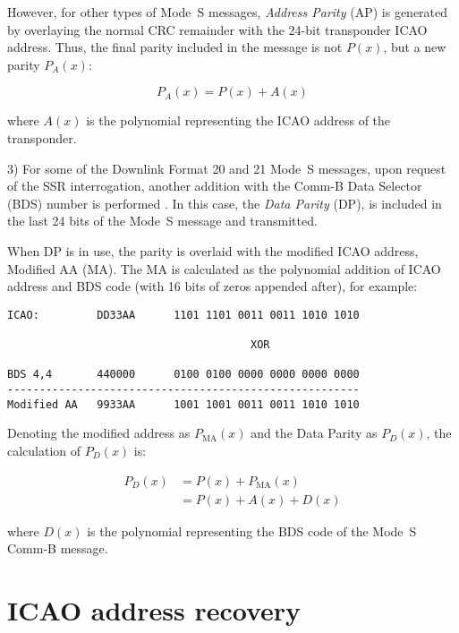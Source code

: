 However, for other types of Mode~S messages, \emph{Address Parity} (AP) is generated by overlaying the normal CRC remainder with the 24-bit transponder ICAO address. Thus, the final parity included in the message is not $P(x)$, but a new parity $P_A(x)$:

\begin{equation}
  P_A(x) = P(x) + A(x)
\end{equation}

\noindent where $A(x)$ is the polynomial representing the ICAO address of the transponder.

3) For some of the Downlink Format 20 and 21 Mode~S messages, upon request of the SSR interrogation, another addition with the Comm-B Data Selector (BDS) number is performed \cite{gertz1984}. In this case, the \emph{Data Parity} (DP), is included in the last 24 bits of the Mode~S message and transmitted.

When DP is in use, the parity is overlaid with the modified ICAO address, Modified AA (MA). The MA is calculated as the polynomial addition of ICAO address and BDS code (with 16 bits of zeros appended after), for example:

\begin{verbatim}
ICAO:         DD33AA      1101 1101 0011 0011 1010 1010

                                      XOR

BDS 4,4       440000      0100 0100 0000 0000 0000 0000
-------------------------------------------------------
Modified AA   9933AA      1001 1001 0011 0011 1010 1010
\end{verbatim}

Denoting the modified address as $P_\mathrm{MA}(x)$ and the Data Parity as $P_D(x)$, the calculation of $P_D(x)$ is:

\begin{equation}
  \begin{split}
    P_D(x) &= P(x) + P_\mathrm{MA}(x) \\
     &= P(x) + A(x) + D(x)
  \end{split}
\end{equation}

\noindent where $D(x)$ is the polynomial representing the BDS code of the Mode~S Comm-B message.


\section{ICAO address recovery}

